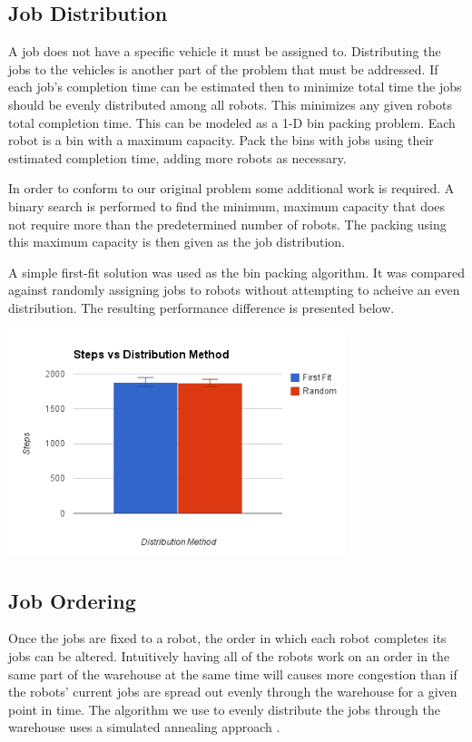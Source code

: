 \documentclass[11pt]{article}
\begin{document}
\subsection{Job Distribution}

A job does not have a specific vehicle it must be assigned to. Distributing the jobs to the vehicles is another part of the problem that must be addressed. If each job's completion time can be estimated then to minimize total time the jobs should be evenly distributed among all robots. This minimizes any given robots total completion time. This can be modeled as a 1-D bin packing problem. Each robot is a bin with a maximum capacity. Pack the bins with jobs using their estimated completion time, adding more robots as necessary. 

In order to conform to our original problem some additional work is required. A binary search is performed to find the minimum, maximum capacity that does not require more than the predetermined number of robots. The packing using this maximum capacity is then given as the job distribution.

A simple first-fit solution was used as the bin packing algorithm. It was compared against randomly assigning jobs to robots without attempting to acheive an even distribution. The resulting performance difference is presented below.

\begin{center}
\includegraphics[height=250px]{distribution_chart.png}
\end{center}

\subsection{Job Ordering}

Once the jobs are fixed to a robot, the order in which each robot completes its jobs can be altered. Intuitively having all of the robots work on an order in the same part of the warehouse at the same time will causes more congestion than if the robots' current jobs are spread out evenly through the warehouse for a given point in time. The algorithm we use to evenly distribute the jobs through the warehouse uses a simulated annealing approach \cite{Bertsimas:98}.
\end{document}
